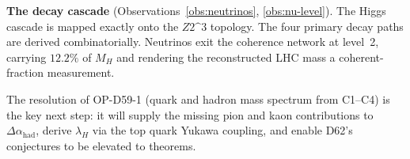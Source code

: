 \documentclass[12pt,a4paper]{article}
\theoremstyle{remark}
\newcommand{\Ztwo}{\mathbb{Z}_{2}^{3}}
\newcommand{\Dahad}{\Delta\alpha_{\mathrm{had}}}
\def\Ztwo{Z2\^{}3}%
\begin{document}
\textbf{The decay cascade} (Observations~\ref{obs:neutrinos},
\ref{obs:nu-level}). The Higgs cascade is mapped exactly onto the $\Ztwo$
topology. The four primary decay paths are derived combinatorially. Neutrinos
exit the coherence network at level~2, carrying $12.2\%$ of $M_{H}$ and
rendering the reconstructed LHC mass a coherent-fraction measurement.

The resolution of OP-D59-1 (quark and hadron mass spectrum from C1--C4) is the
key next step: it will supply the missing pion and kaon contributions to
$\Dahad$, derive $\lambda_{H}$ via the top quark Yukawa coupling, and enable
D62's conjectures to be elevated to theorems.



\end{document}
